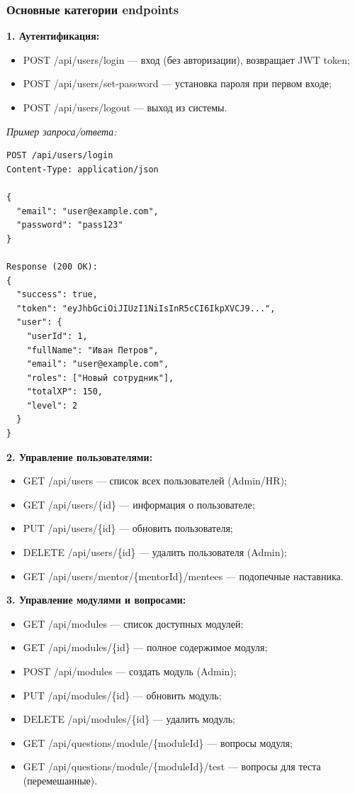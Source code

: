 \subsubsection{Основные категории endpoints}

\textbf{1. Аутентификация:}
\begin{itemize}
    \item POST /api/users/login --- вход (без авторизации), возвращает JWT token;
    \item POST /api/users/set-password --- установка пароля при первом входе;
    \item POST /api/users/logout --- выход из системы.
\end{itemize}

\textit{Пример запроса/ответа:}
\begin{lstlisting}[basicstyle=\ttfamily\small]
POST /api/users/login
Content-Type: application/json

{
  "email": "user@example.com",
  "password": "pass123"
}

Response (200 OK):
{
  "success": true,
  "token": "eyJhbGciOiJIUzI1NiIsInR5cCI6IkpXVCJ9...",
  "user": {
    "userId": 1,
    "fullName": "Иван Петров",
    "email": "user@example.com",
    "roles": ["Новый сотрудник"],
    "totalXP": 150,
    "level": 2
  }
}
\end{lstlisting}

\textbf{2. Управление пользователями:}
\begin{itemize}
    \item GET /api/users --- список всех пользователей (Admin/HR);
    \item GET /api/users/\{id\} --- информация о пользователе;
    \item PUT /api/users/\{id\} --- обновить пользователя;
    \item DELETE /api/users/\{id\} --- удалить пользователя (Admin);
    \item GET /api/users/mentor/\{mentorId\}/mentees --- подопечные наставника.
\end{itemize}

\textbf{3. Управление модулями и вопросами:}
\begin{itemize}
    \item GET /api/modules --- список доступных модулей;
    \item GET /api/modules/\{id\} --- полное содержимое модуля;
    \item POST /api/modules --- создать модуль (Admin);
    \item PUT /api/modules/\{id\} --- обновить модуль;
    \item DELETE /api/modules/\{id\} --- удалить модуль;
    \item GET /api/questions/module/\{moduleId\} --- вопросы модуля;
    \item GET /api/questions/module/\{moduleId\}/test --- вопросы для теста (перемешанные).
\end{itemize}

